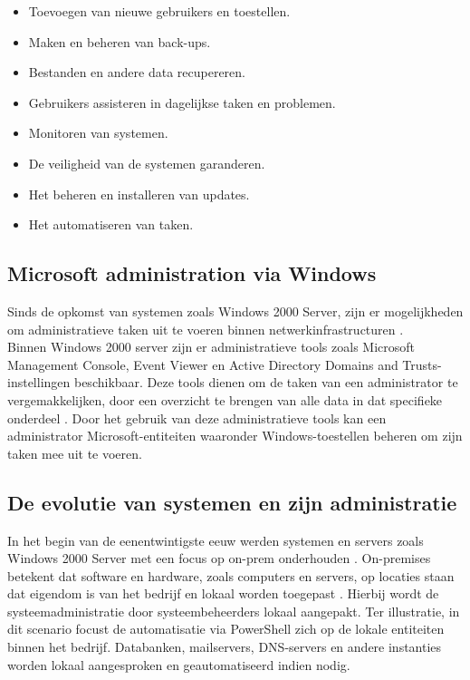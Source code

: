 \begin{itemize}
    \item Toevoegen van nieuwe gebruikers en toestellen.
    \item Maken en beheren van back-ups.
    \item Bestanden en andere data recupereren.
    \item Gebruikers assisteren in dagelijkse taken en problemen.
    \item Monitoren van systemen.
    \item De veiligheid van de systemen garanderen.
    \item Het beheren en installeren van updates.
    \item Het automatiseren van taken.
\end{itemize} 

\subsection{Microsoft administration via Windows}


Sinds de opkomst van systemen zoals Windows 2000 Server, zijn er mogelijkheden om administratieve taken uit te voeren binnen netwerkinfrastructuren \autocite{Tulloch2001}. \\

Binnen Windows 2000 server zijn er administratieve tools zoals Microsoft Management Console, Event Viewer en Active Directory Domains and Trusts-instellingen beschikbaar. Deze tools dienen om de taken van een administrator te vergemakkelijken, door een overzicht te brengen van alle data in dat specifieke onderdeel \autocite{Sibisi2022}. Door het gebruik van deze administratieve tools kan een administrator Microsoft-entiteiten waaronder Windows-toestellen beheren om zijn taken mee uit te voeren. 

\subsection{De evolutie van systemen en zijn administratie}


In het begin van de eenentwintigste eeuw werden systemen en servers zoals Windows 2000 Server met een focus op \ac{on-prem} onderhouden \autocite{Microsoft2022a}. On-premises betekent dat software en hardware, zoals computers en servers, op locaties staan dat eigendom is van het bedrijf en lokaal worden toegepast \autocite{Gastermann2015}. Hierbij wordt de systeemadministratie door systeembeheerders lokaal aangepakt. Ter illustratie, in dit scenario focust de automatisatie via PowerShell zich op de lokale entiteiten binnen het bedrijf. Databanken, mailservers, \ac{DNS}-servers en andere instanties worden lokaal aangesproken en geautomatiseerd indien nodig. \\

